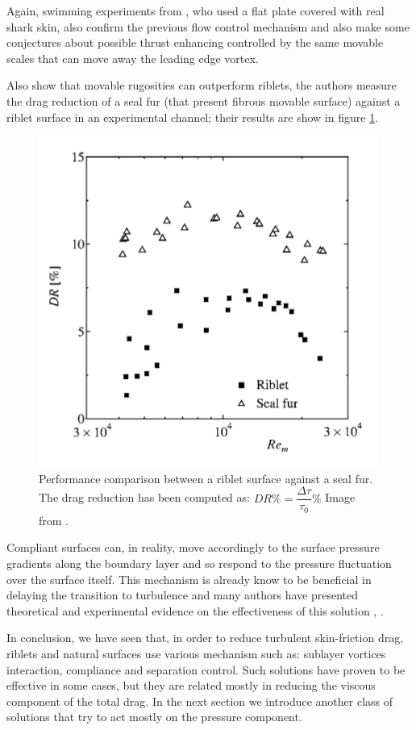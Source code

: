 Again, swimming experiments from \citet{Oeffner785}, who used a flat plate covered with real shark skin, also confirm the previous flow control mechanism and also make some conjectures about possible thrust enhancing controlled by the same movable scales that can move away the leading edge vortex.

Also \citet{itoh2006turbulent} show that movable rugosities can outperform riblets, the authors measure the drag reduction of a seal fur (that present fibrous movable surface) against a riblet surface in an experimental channel; their results are show in figure \ref{fig:seal}.

\begin{figure}[h]
\centering
\includegraphics[width=0.5\linewidth]{chapter_1/seal}
\caption{Performance comparison between a riblet surface against a seal fur. The drag reduction has been computed as: $DR \% = \dfrac{ \Delta \tau}{\tau_{0}} \%$ Image from \citet{itoh2006turbulent}.}
\label{fig:seal}
\end{figure}


Compliant surfaces can, in reality, move accordingly to the surface pressure gradients along the boundary layer and so respond to the pressure fluctuation over the surface itself.
This mechanism is already know to be beneficial in delaying the transition to turbulence and many authors have presented theoretical and experimental evidence on the effectiveness of this solution \citet{carpenter1990status}, \citet{bushnell1977effect}.

In conclusion, we have seen that, in order to reduce turbulent skin-friction drag, riblets and natural surfaces use various mechanism such as: sublayer vortices interaction, compliance and separation control.
Such solutions have proven to be effective in some cases, but they are related mostly in reducing the viscous component of the total drag.
In the next section we introduce another class of solutions that try to act mostly on the pressure component.


